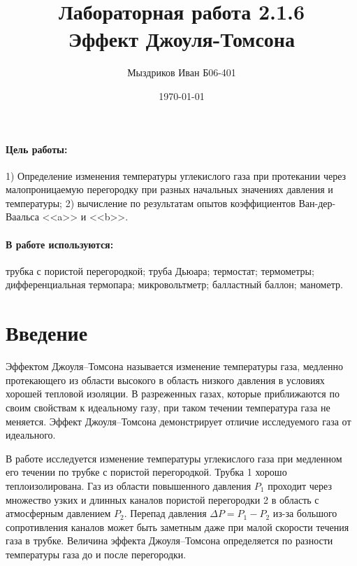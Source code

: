 \documentclass[a4paper,12pt]{article}
\author{Мыздриков Иван Б06-401}
\title{Лабораторная работа 2.1.6 \\
	\textbf{Эффект Джоуля-Томсона}}
\date{\today}
\begin{document}
	
	{\Large \maketitle}

	\paragraph*{Цель работы:} 1) Определение изменения температуры углекислого газа при протекании через малопроницаемую перегородку при разных начальных значениях давления и температуры; 2) вычисление по результатам опытов коэффициентов Ван-дер-Ваальса <<a>> и <<b>>.
	
	\paragraph*{В работе используются:} трубка с пористой перегородкой; труба Дьюара; термостат; термометры; дифференциальная термопара; микровольтметр; балластный баллон; манометр.
	
	\section{Введение}
	Эффектом Джоуля–Томсона называется изменение температуры газа, медленно протекающего из области высокого в область низкого давления в условиях хорошей тепловой изоляции. В разреженных газах, которые приближаются по своим свойствам к идеальному газу, при таком течении температура газа не меняется. Эффект Джоуля–Томсона демонстрирует отличие исследуемого газа от идеального.
	
	В работе исследуется изменение температуры углекислого газа при медленном его течении по трубке с пористой перегородкой. Трубка 1 хорошо теплоизолирована. Газ из области повышенного давления $P_1$ проходит через множество узких и длинных каналов пористой перегородки 2 в область с атмосферным давлением $P_2$. Перепад давления  $\Delta P = P_1 - P_2$ из-за большого сопротивления каналов может быть заметным даже при малой скорости течения газа в трубке. Величина эффекта Джоуля–Томсона определяется по разности температуры газа до и после перегородки.
	
\end{document}
